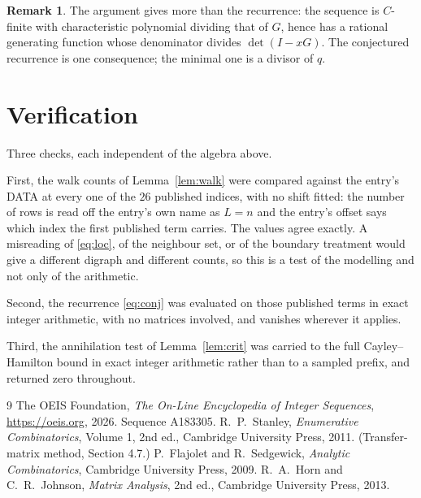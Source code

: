 \documentclass[11pt,a4paper]{article}
\theoremstyle{plain}
\theoremstyle{definition}
\newtheorem{remark}[theorem]{Remark}
\begin{document}
\begin{remark}
The argument gives more than the recurrence: the sequence is $C$-finite with characteristic
polynomial dividing that of $G$, hence has a rational generating function whose denominator
divides $\det(I-xG)$. The conjectured recurrence is one consequence; the minimal one is a
divisor of $q$.
\end{remark}

\section{Verification}

Three checks, each independent of the algebra above.

First, the walk counts of Lemma~\ref{lem:walk} were compared against the entry's DATA at
every one of the $26$ published indices, with no shift fitted: the number of rows is
read off the entry's own name as $L=n$ and the entry's offset says which index the first
published term carries. The values agree exactly. A misreading of \eqref{eq:loc}, of the
neighbour set, or of the boundary treatment would give a different digraph and different
counts, so this is a test of the modelling and not only of the arithmetic.

Second, the recurrence \eqref{eq:conj} was evaluated on those published terms in exact
integer arithmetic, with no matrices involved, and vanishes wherever it applies.

Third, the annihilation test of Lemma~\ref{lem:crit} was carried to the full
Cayley--Hamilton bound in exact integer arithmetic rather than to a sampled prefix, and
returned zero throughout.

\begin{thebibliography}{9}
 The OEIS Foundation, \emph{The On-Line Encyclopedia of Integer
Sequences}, \url{https://oeis.org}, 2026. Sequence A183305.
 R.~P.~Stanley, \emph{Enumerative Combinatorics}, Volume 1, 2nd ed.,
Cambridge University Press, 2011. (Transfer-matrix method, Section 4.7.)
 P.~Flajolet and R.~Sedgewick, \emph{Analytic Combinatorics}, Cambridge
University Press, 2009.
 R.~A.~Horn and C.~R.~Johnson, \emph{Matrix Analysis}, 2nd ed., Cambridge
University Press, 2013.
\end{thebibliography}
\end{document}
